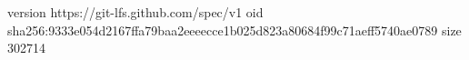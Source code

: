 version https://git-lfs.github.com/spec/v1
oid sha256:9333e054d2167ffa79baa2eeeecce1b025d823a80684f99c71aeff5740ae0789
size 302714
